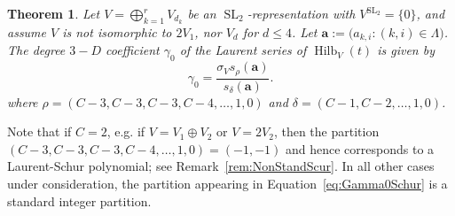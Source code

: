 \documentclass{amsart}
\newtheorem{theorem}{Theorem}[section]
\theoremstyle{definition}
\theoremstyle{remark}
\newcommand{\SL}{\operatorname{SL}}
\newcommand{\bs}{\boldsymbol}
\newcommand{\Hilb}{\operatorname{Hilb}}
\begin{document}
\begin{theorem}
\label{thrm:Gamma0Schur}
Let $V = \bigoplus_{k=1}^r V_{d_k}$ be an $\SL_2$-representation with $V^{\SL_2} = \{0\}$,
and assume $V$ is not isomorphic to $2V_1$, nor $V_d$ for $d \leq 4$.
Let $\bs{a} := \big(a_{k,i} : (k,i)\in\Lambda\big)$. The degree $3-D$ coefficient $\gamma_0$ of
the Laurent series of $\Hilb_V(t)$ is given by
\begin{equation}
\label{eq:Gamma0Schur}
    \gamma_0
    =
    \frac{\sigma_V s_{\rho}(\bs{a}) }
        {s_{\delta}(\bs{a})}.
\end{equation}
where $\rho = (C-3,C-3,C-3,C-4,\ldots,1,0)$ and $\delta = (C-1,C-2,\ldots,1,0)$.
\end{theorem}
Note that if $C  = 2$, e.g. if $V = V_1\oplus V_2$ or $V = 2V_2$, then the partition
$(C-3,C-3,C-3,C-4,\ldots, 1, 0) = (-1,-1)$ and hence corresponds to a Laurent-Schur
polynomial; see Remark~\ref{rem:NonStandScur}. In all other cases under consideration,
the partition appearing in Equation~\eqref{eq:Gamma0Schur} is a standard integer
partition.
\end{document}
